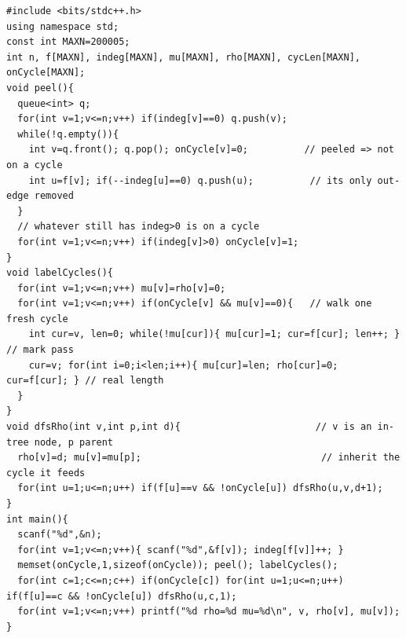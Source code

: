 \begin{lstlisting}[caption={Functional-graph decomposition: peel in-degrees to find cycle nodes, then a DFS/DP gives rho(v) tail length and mu(v) cycle length per component. ASCII only, identifiers without underscores}, label={lst:c31-peel}]
#include <bits/stdc++.h>
using namespace std;
const int MAXN=200005;
int n, f[MAXN], indeg[MAXN], mu[MAXN], rho[MAXN], cycLen[MAXN], onCycle[MAXN];
void peel(){
  queue<int> q;
  for(int v=1;v<=n;v++) if(indeg[v]==0) q.push(v);
  while(!q.empty()){
    int v=q.front(); q.pop(); onCycle[v]=0;          // peeled => not on a cycle
    int u=f[v]; if(--indeg[u]==0) q.push(u);          // its only out-edge removed
  }
  // whatever still has indeg>0 is on a cycle
  for(int v=1;v<=n;v++) if(indeg[v]>0) onCycle[v]=1;
}
void labelCycles(){
  for(int v=1;v<=n;v++) mu[v]=rho[v]=0;
  for(int v=1;v<=n;v++) if(onCycle[v] && mu[v]==0){   // walk one fresh cycle
    int cur=v, len=0; while(!mu[cur]){ mu[cur]=1; cur=f[cur]; len++; }  // mark pass
    cur=v; for(int i=0;i<len;i++){ mu[cur]=len; rho[cur]=0; cur=f[cur]; } // real length
  }
}
void dfsRho(int v,int p,int d){                        // v is an in-tree node, p parent
  rho[v]=d; mu[v]=mu[p];                                // inherit the cycle it feeds
  for(int u=1;u<=n;u++) if(f[u]==v && !onCycle[u]) dfsRho(u,v,d+1);
}
int main(){
  scanf("%d",&n);
  for(int v=1;v<=n;v++){ scanf("%d",&f[v]); indeg[f[v]]++; }
  memset(onCycle,1,sizeof(onCycle)); peel(); labelCycles();
  for(int c=1;c<=n;c++) if(onCycle[c]) for(int u=1;u<=n;u++) if(f[u]==c && !onCycle[u]) dfsRho(u,c,1);
  for(int v=1;v<=n;v++) printf("%d rho=%d mu=%d\n", v, rho[v], mu[v]);
}
\end{lstlisting}

